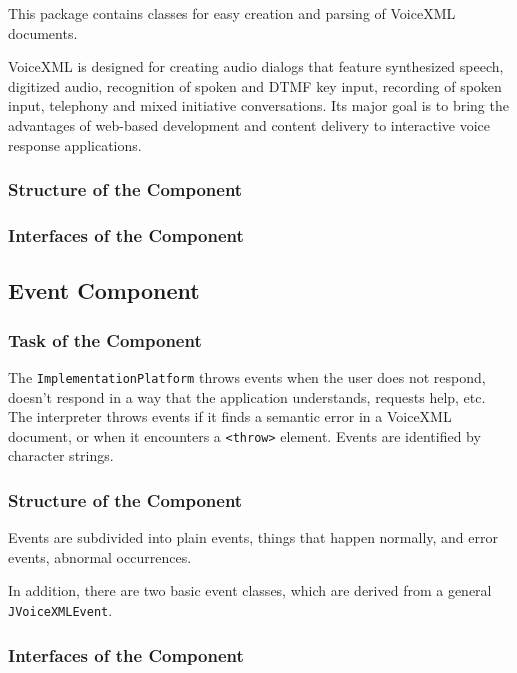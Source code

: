 \documentclass[11pt,a4paper]{article}
\begin{document}
This package contains classes for easy creation and parsing of VoiceXML
documents.

VoiceXML is designed for creating audio dialogs that feature synthesized
speech, digitized audio, recognition of spoken and DTMF key input, recording
of spoken input, telephony and mixed initiative conversations. Its major goal
is to bring the advantages of web-based development and content delivery to
interactive voice response applications.

\subsubsection{Structure of the Component}


\subsubsection{Interfaces of the Component}

\subsection{Event Component}
\label{sec:event-component}

\subsubsection{Task of the Component}

The \texttt{ImplementationPlatform} throws events when the user does not 
respond, doesn't respond in a way that the application understands, requests 
help, etc. The interpreter
throws events if it finds a semantic error in a VoiceXML document, or when it
encounters a \texttt{<throw>} element. Events are identified by
character strings.

\subsubsection{Structure of the Component}

Events are subdivided into plain events, things that happen normally, and
error events, abnormal occurrences.

In addition, there are two basic event classes, which are derived from
a general \texttt{JVoiceXMLEvent}.

\subsubsection{Interfaces of the Component}
\end{document}
